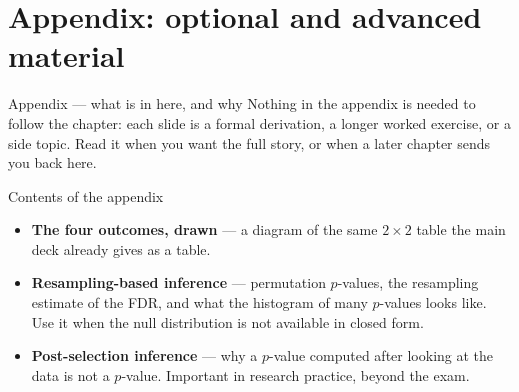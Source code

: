 \documentclass[aspectratio=169,11pt]{beamer}
\begin{document}
\appendix
\AtBeginSection[]{}
\section{Appendix: optional and advanced material}

\begin{frame}{Appendix --- what is in here, and why}
  \small
  Nothing in the appendix is needed to follow the chapter: each slide is a
  formal derivation, a longer worked exercise, or a side topic. Read it when
  you want the full story, or when a later chapter sends you back here.
  \begin{block}{Contents of the appendix}
    \begin{itemize}
      \item \textbf{The four outcomes, drawn} --- a diagram of the same $2\times2$ table the main deck already gives as a table.
      \item \textbf{Resampling-based inference} --- permutation $p$-values, the resampling estimate of the FDR, and what the histogram of many $p$-values looks like. Use it when the null distribution is not available in closed form.
      \item \textbf{Post-selection inference} --- why a $p$-value computed after looking at the data is not a $p$-value. Important in research practice, beyond the exam.
    \end{itemize}
  \end{block}
\end{frame}
\end{document}
